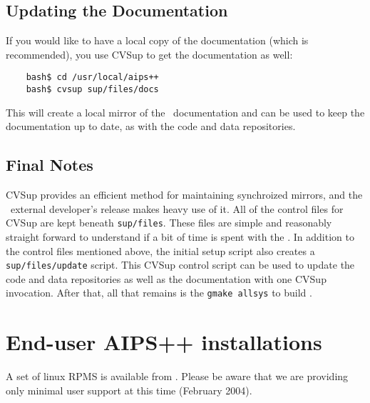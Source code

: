 \subsection{Updating the Documentation }
\label{developer release documentation}

If you would like to have a local copy of the documentation (which is recommended),
you use CVSup to get the documentation as well:
\begin{verbatim}
    bash$ cd /usr/local/aips++
    bash$ cvsup sup/files/docs
\end{verbatim}
This will create a local mirror of the \aipspp\ documentation and can be
used to keep the documentation up to date, as with the code and data
repositories.

\subsection{Final Notes}

CVSup provides an efficient method for maintaining synchroized mirrors, and
the \aipspp\ external developer's release makes heavy use of it. All of the
control files for CVSup are kept beneath \verb+sup/files+. These files are
simple and reasonably straight forward to understand if a bit of time is
spent with the
.
In addition to the control files mentioned above, the initial setup script
also creates a \verb+sup/files/update+ script. This CVSup control script
can be used to update the code and data repositories as well as the documentation
with one CVSup invocation. After that, all that remains is the \verb+gmake allsys+
to build \aipspp.


\section{End-user AIPS++ installations}
\label{End-user installation}

A set of linux RPMS is available from 
.
Please be aware that we are providing only minimal user support at this time (February 2004).



